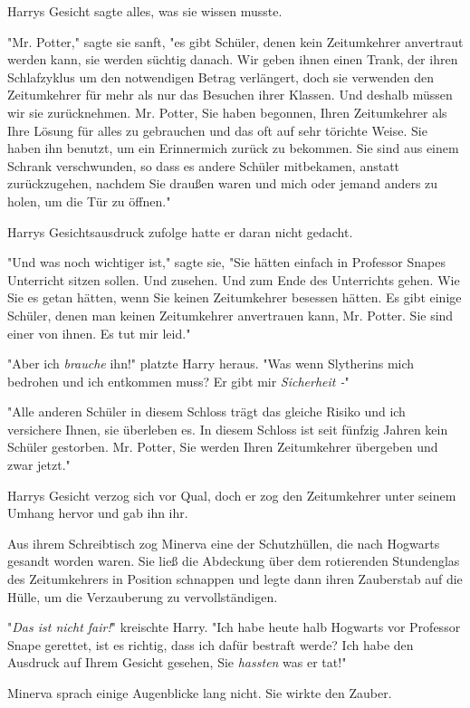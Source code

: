 {Harrys Gesicht sagte alles, was sie wissen musste.

"Mr. Potter," sagte sie sanft, "es gibt Schüler, denen kein Zeitumkehrer anvertraut werden kann, sie werden süchtig danach. Wir geben ihnen einen Trank, der ihren Schlafzyklus um den notwendigen Betrag verlängert, doch sie verwenden den Zeitumkehrer für mehr als nur das Besuchen ihrer Klassen. Und deshalb müssen wir sie zurücknehmen. Mr. Potter, Sie haben begonnen, Ihren Zeitumkehrer als Ihre Lösung für alles zu gebrauchen und das oft auf sehr törichte Weise. Sie haben ihn benutzt, um ein Erinnermich zurück zu bekommen. Sie sind aus einem Schrank verschwunden, so dass es andere Schüler mitbekamen, anstatt zurückzugehen, nachdem Sie draußen waren und mich oder jemand anders zu holen, um die Tür zu öffnen."

Harrys Gesichtsausdruck zufolge hatte er daran nicht gedacht.

"Und was noch wichtiger ist," sagte sie, "Sie hätten einfach in Professor Snapes Unterricht sitzen sollen. Und zusehen. Und zum Ende des Unterrichts gehen. Wie Sie es getan hätten, wenn Sie keinen Zeitumkehrer besessen hätten. Es gibt einige Schüler, denen man keinen Zeitumkehrer anvertrauen kann, Mr. Potter. Sie sind einer von ihnen. Es tut mir leid."

"Aber ich \emph{brauche} ihn!" platzte Harry heraus. "Was wenn Slytherins mich bedrohen und ich entkommen muss? Er gibt mir \emph{Sicherheit -}"

"Alle anderen Schüler in diesem Schloss trägt das gleiche Risiko und ich versichere Ihnen, sie überleben es. In diesem Schloss ist seit fünfzig Jahren kein Schüler gestorben. Mr. Potter, Sie werden Ihren Zeitumkehrer übergeben und zwar jetzt."

Harrys Gesicht verzog sich vor Qual, doch er zog den Zeitumkehrer unter seinem Umhang hervor und gab ihn ihr.

Aus ihrem Schreibtisch zog Minerva eine der Schutzhüllen, die nach Hogwarts gesandt worden waren. Sie ließ die Abdeckung über dem rotierenden Stundenglas des Zeitumkehrers in Position schnappen und legte dann ihren Zauberstab auf die Hülle, um die Verzauberung zu vervollständigen.

"\emph{Das ist nicht fair!}" kreischte Harry. "Ich habe heute halb Hogwarts vor Professor Snape gerettet, ist es richtig, dass ich dafür bestraft werde? Ich habe den Ausdruck auf Ihrem Gesicht gesehen, Sie \emph{hassten} was er tat!"

Minerva sprach einige Augenblicke lang nicht. Sie wirkte den Zauber.

}
